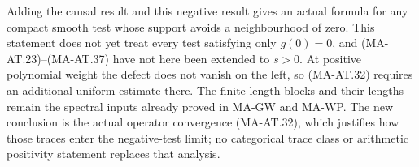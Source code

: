 Adding the causal result and this negative result gives an
actual formula for any compact smooth test whose support
avoids a neighbourhood of zero.
This statement does not yet treat every test satisfying only
\(g(0)=0\), and (MA-AT.23)--(MA-AT.37) have not here been
extended to \(s>0\).  At positive polynomial weight the defect
does not vanish on the left, so (MA-AT.32) requires an additional
uniform estimate there.
The finite-length blocks and their lengths remain the spectral
inputs already proved in MA-GW and MA-WP.  The new conclusion is
the actual operator convergence (MA-AT.32), which justifies how
those traces enter the negative-test limit; no categorical trace
class or arithmetic positivity statement replaces that analysis.
